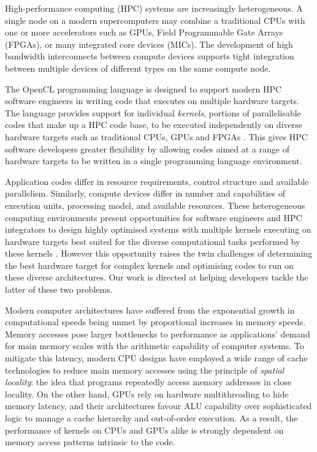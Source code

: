 \documentclass[review=false, sigchi]{acmart}
\begin{document}
	High-performance computing (HPC) systems are increasingly heterogeneous.
	A single node on a modern supercomputers may combine a traditional CPUs with one or more accelerators such as GPUs, Field Programmable Gate Arrays (FPGAs), or many integrated core devices (MICs).
	The development of high bandwidth interconnects between compute devices supports tight integration between multiple devices of different types on the same compute node.
	
	The OpenCL programming language is designed to support modern HPC software engineers in writing code that executes on multiple hardware targets. 
	The language provides support for individual \emph{kernels}, portions of parallelisable codes that make up a HPC code base, to be executed independently on diverse hardware targets such as traditional CPUs, GPUs and FPGAs \cite{khronosopenclworkinggroup2011opencl}. This gives HPC software developers greater flexibility by allowing codes aimed at a range of hardware targets to be written in a single programming language environment.
	
	Application codes differ in resource requirements, control structure and available parallelism. Similarly, compute devices differ in number and capabilities of execution units, processing model, and available resources. These heterogeneous computing environments present opportunities for software engineers and HPC integrators to design highly optimised systems with multiple kernels executing on hardware targets best suited for the diverse computational tasks performed by these kernels \cite{spafford2010maestro}.
	However this opportunity raises the twin challenges of determining the best hardware target for complex kernels and optimising codes to run on these diverse architectures.
	Our work is directed at helping developers tackle the latter of these two problems.
	
	Modern computer architectures have suffered from the exponential growth in computational speeds being unmet by proportional increases in memory speeds\cite{hennessycomparch}. Memory accesses pose larger bottlenecks to performance as applications' demand for main memory scales with the arithmetic capability of computer systems. To mitigate this latency, modern CPU designs have employed a wide range of cache technologies to reduce main memory accesses using the principle of \emph{spatial locality}: the idea that programs repeatedly access memory addresses in close locality. On the other hand, GPUs rely on hardware multithreading to hide memory latency, and their architectures favour ALU capability over sophisticated logic to manage a cache hierarchy and out-of-order execution. As a result, the performance of kernels on CPUs and GPUs alike is strongly dependent on memory access patterns intrinsic to the code. %
	
\end{document}
